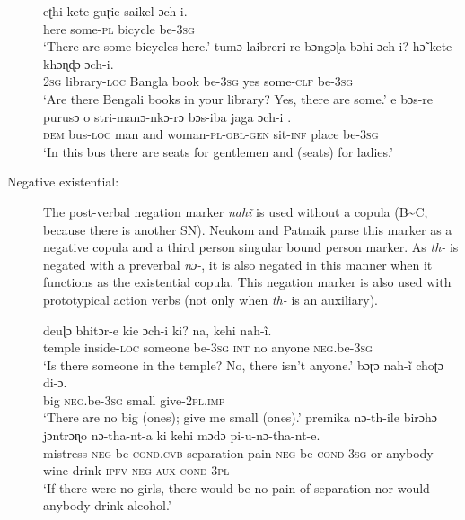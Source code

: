 \documentclass[output=paper,colorlinks,citecolor=brown]{langscibook}
\begin{document}
\begin{paperappendix}
\begin{unindented}
\begin{description}
\begin{exe}\ex \gll eʈhi kete-guɽie  saikel  ɔch-i.\\
here some-\textsc{pl}  bicycle be-\textsc{3sg} \\
    \glt `There are some bicycles here.' \parencite[47]{NeukomPatnaik2003}
\ex \gll tumɔ laibreri-re bɔngɔɭa bɔhi  ɔch-i? hɔ̃ kete-khɔɳɖɔ ɔch-i.  \\
\textsc{2sg} library-\textsc{loc} Bangla book be-\textsc{3sg} yes some-\textsc{clf} be-\textsc{3sg} \\
    \glt `Are there Bengali books in your library? Yes, there are some.'
\parencite[118]{NeukomPatnaik2003}
\ex \gll e bɔs-re purusɔ o stri-manɔ-nkɔ-rɔ bɔs-iba jaga  ɔch-i .\\
\textsc{dem} bus-\textsc{loc} man and woman-\textsc{pl-obl-gen} sit-\textsc{inf} place be-\textsc{3sg} \\
\glt `In this bus there are seats for gentlemen and (seats) for ladies.'
\parencite[38]{NeukomPatnaik2003}
    \end{exe}

\item[Negative existential:] The post-verbal negation marker \textit{nahĩ} is used without a copula (B{\textasciitilde}C, because there is another SN). Neukom and Patnaik parse this marker as a negative copula and a third person singular bound person marker. As \textit{th-} is negated with a preverbal \textit{nɔ-}, it is also negated in this manner when it functions as the existential copula. This negation marker is also used with prototypical action verbs (not only when \textit{th-} is an auxiliary). 

\begin{exe}\ex \gll deuɭɔ bhitɔr-e kie ɔch-i ki? na, kehi nah-ĩ. \\
temple inside-\textsc{loc}   someone be-\textsc{3sg}   \textsc{int}      no  anyone \textsc{neg}.be-\textsc{3sg} \\
    \glt `Is there someone in the temple? No, there isn't anyone.'
\parencite[100]{NeukomPatnaik2003}
\ex \gll bɔɽɔ nah-ĩ choʈɔ di-ɔ. \\
big \textsc{neg}.be-\textsc{3sg} small give-\textsc{2pl.imp} \\
    \glt `There are no big (ones); give me small (ones).' \parencite[72]{NeukomPatnaik2003} 
\ex \gll premika nɔ-th-ile birɔhɔ jɔntrɔɳo nɔ-tha-nt-a ki kehi mɔdɔ pi-u-nɔ-tha-nt-e. \\
mistress \textsc{neg}-be-\textsc{cond}.\textsc{cvb}   separation pain        \textsc{neg}-be-\textsc{cond}-\textsc{3sg} or anybody wine drink-\textsc{ipfv-neg-aux-cond-3pl} \\
    \glt `If there were no girls, there would be no pain of separation nor would anybody drink alcohol.' \parencite[195]{NeukomPatnaik2003}
\end{exe}


\end{description}
\end{unindented}
\end{paperappendix}
\end{document}

